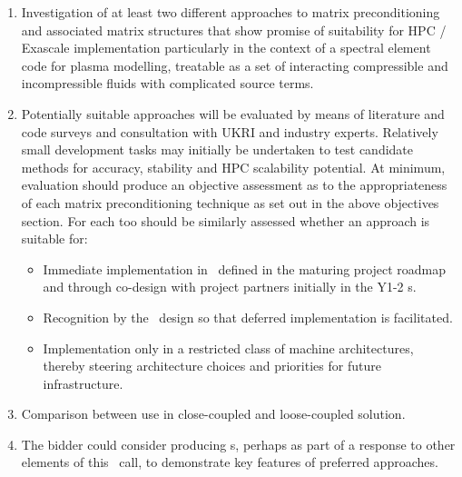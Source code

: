 \begin{enumerate}
\item Investigation of at least two different approaches to
matrix preconditioning and associated matrix structures
that show promise of suitability for HPC / Exascale implementation particularly
in the context of a spectral element code for plasma modelling,
treatable as a set of interacting compressible and incompressible fluids with complicated source terms.

\item Potentially suitable approaches will be evaluated by means of  
literature and code surveys and consultation
with UKRI and industry experts.
Relatively small development tasks may initially be undertaken to  
test candidate methods for 
accuracy, stability and HPC scalability potential.
At minimum, evaluation should produce an objective assessment as to
the appropriateness of each matrix preconditioning technique as set out in the 
above objectives section. For each too should be similarly assessed
whether an approach is suitable for:
\begin{itemize}
\item Immediate implementation in \nep\ defined in the maturing project roadmap
and through co-design with project partners initially in the Y1-2 \papp s.
\item Recognition by the \nep\ design so that deferred implementation is facilitated.
\item Implementation only in a restricted class of machine architectures, thereby
steering architecture choices and priorities for future infrastructure.
\end{itemize}

\item Comparison between use in close-coupled and loose-coupled solution.

\item The bidder could consider producing \papp s, perhaps as  
part of a response to other elements of this \nep\ call, to  
demonstrate key features of preferred approaches.

\end{enumerate}

%
